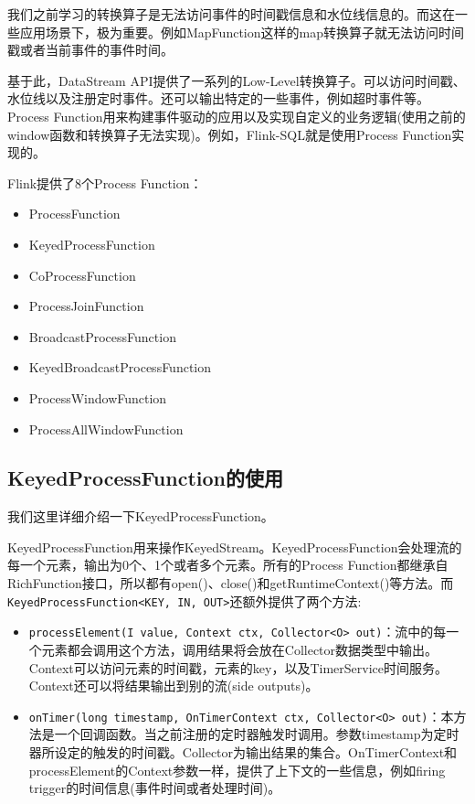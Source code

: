 \documentclass[cn,11pt,chinese]{elegantbook}
\providecommand{\tightlist}{%
  \setlength{\itemsep}{0pt}\setlength{\parskip}{0pt}}
\begin{document}
我们之前学习的转换算子是无法访问事件的时间戳信息和水位线信息的。而这在一些应用场景下，极为重要。例如MapFunction这样的map转换算子就无法访问时间戳或者当前事件的事件时间。

基于此，DataStream
API提供了一系列的Low-Level转换算子。可以访问时间戳、水位线以及注册定时事件。还可以输出特定的一些事件，例如超时事件等。Process
Function用来构建事件驱动的应用以及实现自定义的业务逻辑(使用之前的window函数和转换算子无法实现)。例如，Flink-SQL就是使用Process
Function实现的。

Flink提供了8个Process Function：

\begin{itemize}
\tightlist
\item
  ProcessFunction
\item
  KeyedProcessFunction
\item
  CoProcessFunction
\item
  ProcessJoinFunction
\item
  BroadcastProcessFunction
\item
  KeyedBroadcastProcessFunction
\item
  ProcessWindowFunction
\item
  ProcessAllWindowFunction
\end{itemize}

\hypertarget{keyedprocessfunctionux7684ux4f7fux7528}{%
\subsection{KeyedProcessFunction的使用}\label{keyedprocessfunctionux7684ux4f7fux7528}}

我们这里详细介绍一下KeyedProcessFunction。

KeyedProcessFunction用来操作KeyedStream。KeyedProcessFunction会处理流的每一个元素，输出为0个、1个或者多个元素。所有的Process
Function都继承自RichFunction接口，所以都有open()、close()和getRuntimeContext()等方法。而\texttt{KeyedProcessFunction\textless{}KEY,\ IN,\ OUT\textgreater{}}还额外提供了两个方法:

\begin{itemize}
\tightlist
\item
  \texttt{processElement(I\ value,\ Context\ ctx,\ Collector\textless{}O\textgreater{}\ out)}：流中的每一个元素都会调用这个方法，调用结果将会放在Collector数据类型中输出。Context可以访问元素的时间戳，元素的key，以及TimerService时间服务。Context还可以将结果输出到别的流(side
  outputs)。
\item
  \texttt{onTimer(long\ timestamp,\ OnTimerContext\ ctx,\ Collector\textless{}O\textgreater{}\ out)}：本方法是一个回调函数。当之前注册的定时器触发时调用。参数timestamp为定时器所设定的触发的时间戳。Collector为输出结果的集合。OnTimerContext和processElement的Context参数一样，提供了上下文的一些信息，例如firing
  trigger的时间信息(事件时间或者处理时间)。
\end{itemize}
\end{document}
